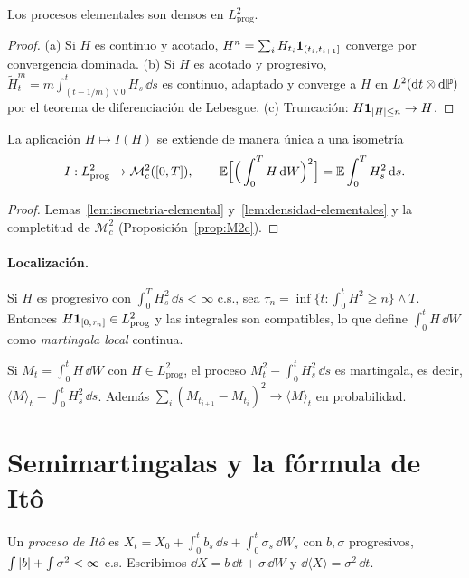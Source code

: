 \begin{lema}\label{lem:densidad-elementales}
Los procesos elementales son densos en $L^2_{\mathrm{prog}}$.
\end{lema}

\begin{proof}
(a) Si $H$ es continuo y acotado, $H^n=\sum_iH_{t_i}\mathbf{1}_{(t_i,t_{i+1}]}$ converge por convergencia
dominada. (b) Si $H$ es acotado y progresivo, $\tilde H^m_t=m\int_{(t-1/m)\vee0}^tH_s\,\dd s$ es continuo, adaptado y
converge a $H$ en $L^2(\mathrm{d} t\otimes\mathrm{d}\mathbb{P})$ por el teorema de diferenciación de Lebesgue. (c) Truncación:
$H\mathbf{1}_{\left\lvert H\right\rvert\le n}\to H$.
\end{proof}

\begin{teorema}\label{teo:integral-ito}
La aplicación $H\mapsto I(H)$ se extiende de manera única a
una isometría
\[
  I:L^2_{\mathrm{prog}}\to\mathcal M^2_c([0,T]),\qquad\mathbb{E}\Big[\Big(\int_0^TH\,\mathrm{d} W\Big)^2\Big]=\mathbb{E}\int_0^TH_s^2\,\mathrm{d} s.
\]
\end{teorema}

\begin{proof}
Lemas~\ref{lem:isometria-elemental} y~\ref{lem:densidad-elementales} y la completitud de $\mathcal M^2_c$ (Proposición~\ref{prop:M2c}).
\end{proof}

\paragraph{Localización.} Si $H$ es progresivo con $\int_0^TH_s^2\,\dd s<\infty$ c.s., sea $\tau_n=\inf\{t:\int_0^tH^2\ge n\}\wedge T$.
Entonces $H\mathbf{1}_{[0,\tau_n]}\in L^2_{\mathrm{prog}}$ y las integrales son compatibles, lo que define $\int_0^tH\,\dd W$ como
\emph{martingala local} continua.

\begin{proposicion}
Si $M_t=\int_0^tH\,\dd W$ con $H\in L^2_{\mathrm{prog}}$, el
proceso $M_t^2-\int_0^tH_s^2\,\dd s$ es martingala, es decir, $\langle M\rangle_t=\int_0^tH_s^2\,\dd s$. Además $\sum_i(M_{t_{i+1}}-M_{t_i})^2\to
\langle M\rangle_t$ en probabilidad.
\end{proposicion}

\section{Semimartingalas y la fórmula de Itô}
Un \emph{proceso de Itô} es $X_t=X_0+\int_0^tb_s\,\dd s+\int_0^t\sigma_s\,\dd W_s$ con $b,\sigma$ progresivos, $\int\left\lvert b\right\rvert+\int\sigma^2<\infty$ c.s.
Escribimos $\dd X=b\,\dd t+\sigma\,\dd W$ y $\dd\langle X\rangle=\sigma^2\,\dd t$.

